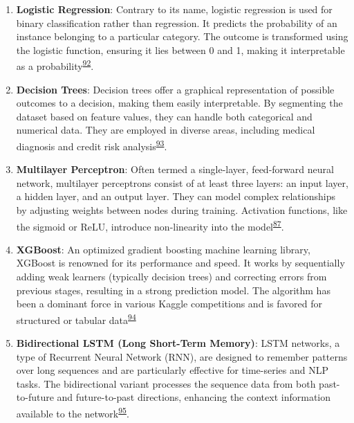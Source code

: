 \documentclass[
  10pt,
]{scrbook}
\let\originaltextbf\textbf
\renewcommand{\textbf}[1]{\textcolor{color1}{\originaltextbf{#1}}}
\begin{document}
\begin{enumerate}
\def\labelenumi{\arabic{enumi}.}
\item
  \textbf{Logistic Regression}: Contrary to its name, logistic
  regression is used for binary classification rather than regression.
  It predicts the probability of an instance belonging to a particular
  category. The outcome is transformed using the logistic function,
  ensuring it lies between 0 and 1, making it interpretable as a
  probability\textsuperscript{\protect\hyperlink{ref-McCullagh_1989}{92}}.
\item
  \textbf{Decision Trees}: Decision trees offer a graphical
  representation of possible outcomes to a decision, making them easily
  interpretable. By segmenting the dataset based on feature values, they
  can handle both categorical and numerical data. They are employed in
  diverse areas, including medical diagnosis and credit risk
  analysis\textsuperscript{\protect\hyperlink{ref-quinlan_1986}{93}}.
\item
  \textbf{Multilayer Perceptron}: Often termed a single-layer,
  feed-forward neural network, multilayer perceptrons consist of at
  least three layers: an input layer, a hidden layer, and an output
  layer. They can model complex relationships by adjusting weights
  between nodes during training. Activation functions, like the sigmoid
  or ReLU, introduce non-linearity into the
  model\textsuperscript{\protect\hyperlink{ref-Goodfellow-et-al-2016}{87}}.
\item
  \textbf{XGBoost}: An optimized gradient boosting machine learning
  library, XGBoost is renowned for its performance and speed. It works
  by sequentially adding weak learners (typically decision trees) and
  correcting errors from previous stages, resulting in a strong
  prediction model. The algorithm has been a dominant force in various
  Kaggle competitions and is favored for structured or tabular
  data\textsuperscript{\protect\hyperlink{ref-Chen_xgboost_2016}{94}}
\item
  \textbf{Bidirectional LSTM (Long Short-Term Memory)}: LSTM networks, a
  type of Recurrent Neural Network (RNN), are designed to remember
  patterns over long sequences and are particularly effective for
  time-series and NLP tasks. The bidirectional variant processes the
  sequence data from both past-to-future and future-to-past directions,
  enhancing the context information available to the
  network\textsuperscript{\protect\hyperlink{ref-graves_2005}{95}}.
\end{enumerate}
\end{document}
